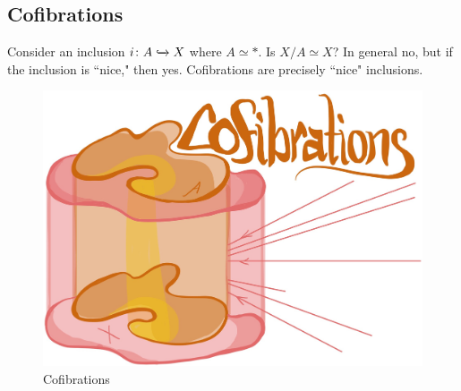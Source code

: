 \documentclass{article}[11pt]
\begin{document}
\subsection{Cofibrations}


Consider an inclusion $i \colon A \xhookrightarrow{} X$ where $A\simeq \ast$. Is $X/A\simeq  X$? In general no, but if the inclusion is ``nice," then yes. Cofibrations are precisely ``nice" inclusions.

		\begin{figure}[h]
  \includegraphics[scale=.13]{pics/cof.png}
  \centering
  \caption{Cofibrations}
  \label{fig:cof}
\end{figure}
\end{document}
